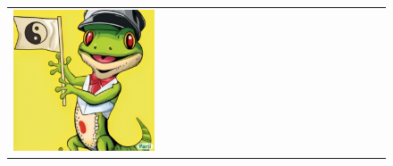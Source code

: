 \begin{figure}[ht!]
\begin{adjustwidth}{-0.8in}{-0.5in}
\begin{tabular}{cccccccccccccccccccc}
\multicolumn{2}{c}{\includegraphics[width=\threebythreecolwidth\textwidth]{figures/cherries/comic.jpg}} \\


\end{tabular}
\end{adjustwidth}
\end{figure}
